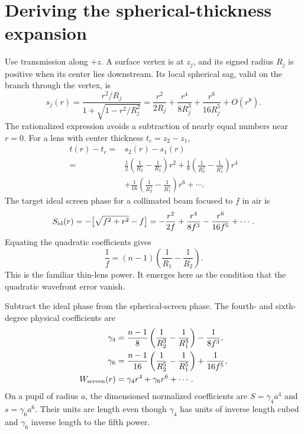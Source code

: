 \section{Deriving the spherical-thickness expansion}
Use transmission along $+z$. A surface vertex is at $z_j$, and its signed
radius $R_j$ is positive when its center lies downstream. Its local spherical
sag, valid on the branch through the vertex, is
\begin{equation}
 s_j(r)=\frac{r^2/R_j}{1+\sqrt{1-r^2/R_j^2}}
       =\frac{r^2}{2R_j}+\frac{r^4}{8R_j^3}
        +\frac{r^6}{16R_j^5}+O(r^8).
\end{equation}
The rationalized expression avoids a subtraction of nearly equal numbers
near $r=0$. For a lens with center thickness $t_c=z_2-z_1$,
\begin{align}
 t(r)-t_c={}&s_2(r)-s_1(r)\\
 ={}&\frac12\left(\frac1{R_2}-\frac1{R_1}\right)r^2
   +\frac18\left(\frac1{R_2^3}-\frac1{R_1^3}\right)r^4\nonumber\\
 &+\frac1{16}\left(\frac1{R_2^5}-\frac1{R_1^5}\right)r^6+\cdots.
\end{align}
The target ideal screen phase for a collimated beam focused to $f$ in air is
\begin{equation}
 S_{\rm id}(r)=-\bigl[\sqrt{f^2+r^2}-f\bigr]
       =-\frac{r^2}{2f}+\frac{r^4}{8f^3}
          -\frac{r^6}{16f^5}+\cdots.
\end{equation}
Equating the quadratic coefficients gives
\begin{equation}
 \boxed{\frac1f=(n-1)\left(\frac1{R_1}-\frac1{R_2}\right).}
\end{equation}
This is the familiar thin-lens power. It emerges here as the condition that
the quadratic wavefront error vanish.

Subtract the ideal phase from the spherical-screen phase. The fourth- and
sixth-degree physical coefficients are
\begin{align}
 \gamma_4&=\frac{n-1}{8}
       \left(\frac1{R_2^3}-\frac1{R_1^3}\right)-\frac1{8f^3},\\
 \gamma_6&=\frac{n-1}{16}
       \left(\frac1{R_2^5}-\frac1{R_1^5}\right)+\frac1{16f^5},\\
 W_{\rm screen}(r)&=\gamma_4r^4+\gamma_6r^6+\cdots.
 \label{ab:lensscreen46}
\end{align}
On a pupil of radius $a$, the dimensioned normalized coefficients are
$S=\gamma_4a^4$ and $s=\gamma_6a^6$. Their units are length even though
$\gamma_4$ has units of inverse length cubed and $\gamma_6$ inverse length
to the fifth power.

